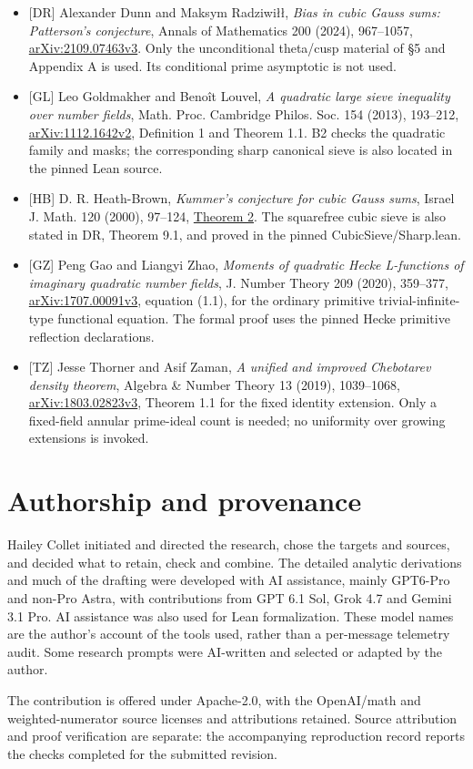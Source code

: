 \documentclass[11pt,a4paper]{article}
\newcommand{\sourcecode}[1]{{\small\ttfamily #1}}
\providecommand{\tightlist}{\setlength{\itemsep}{0pt}\setlength{\parskip}{0pt}}
\begin{document}
\begin{itemize}
\tightlist
\item
  {[}DR{]} Alexander Dunn and Maksym Radziwiłł, \emph{Bias in cubic
  Gauss sums: Patterson's conjecture}, Annals of Mathematics 200 (2024),
  967--1057,
  \href{https://arxiv.org/html/2109.07463v3}{arXiv:2109.07463v3}. Only
  the unconditional theta/cusp material of §5 and Appendix A is used.
  Its conditional prime asymptotic is not used.
\item
  {[}GL{]} Leo Goldmakher and Benoît Louvel, \emph{A quadratic large
  sieve inequality over number fields}, Math. Proc. Cambridge Philos.
  Soc. 154 (2013), 193--212,
  \href{https://arxiv.org/pdf/1112.1642v2}{arXiv:1112.1642v2},
  Definition 1 and Theorem 1.1. B2 checks the quadratic family and
  masks; the corresponding sharp canonical sieve is also located in the
  pinned Lean source.
\item
  {[}HB{]} D. R. Heath-Brown, \emph{Kummer's conjecture for cubic Gauss
  sums}, Israel J. Math. 120 (2000), 97--124,
  \href{https://doi.org/10.1007/s11856-000-1273-y}{Theorem 2}. The
  squarefree cubic sieve is also stated in DR, Theorem 9.1, and proved
  in the pinned \sourcecode{Cubic\allowbreak{}Sieve/\allowbreak{}Sharp.\allowbreak{}lean}.
\item
  {[}GZ{]} Peng Gao and Liangyi Zhao, \emph{Moments of quadratic Hecke
  L-functions of imaginary quadratic number fields}, J. Number Theory
  209 (2020), 359--377,
  \href{https://arxiv.org/html/1707.00091v3}{arXiv:1707.00091v3},
  equation (1.1), for the ordinary primitive trivial-infinite-type
  functional equation. The formal proof uses the pinned Hecke primitive
  reflection declarations.
\item
  {[}TZ{]} Jesse Thorner and Asif Zaman, \emph{A unified and improved
  Chebotarev density theorem}, Algebra \& Number Theory 13 (2019),
  1039--1068,
  \href{https://arxiv.org/html/1803.02823v3}{arXiv:1803.02823v3},
  Theorem 1.1 for the fixed identity extension. Only a fixed-field
  annular prime-ideal count is needed; no uniformity over growing
  extensions is invoked.
\end{itemize}

\hypertarget{authorship-and-provenance}{%
\section{Authorship and provenance}\label{authorship-and-provenance}}

Hailey Collet initiated and directed the research, chose the targets and
sources, and decided what to retain, check and combine. The detailed
analytic derivations and much of the drafting were developed with AI
assistance, mainly GPT6-Pro and non-Pro Astra, with contributions from
GPT 6.1 Sol, Grok 4.7 and Gemini 3.1 Pro. AI assistance was also used
for Lean formalization. These model names are the author's account of
the tools used, rather than a per-message telemetry audit. Some research
prompts were AI-written and selected or adapted by the author.

The contribution is offered under Apache-2.0, with the OpenAI/math and
weighted-numerator source licenses and attributions retained. Source
attribution and proof verification are separate: the accompanying
reproduction record reports the checks completed for the submitted
revision.
\end{document}
